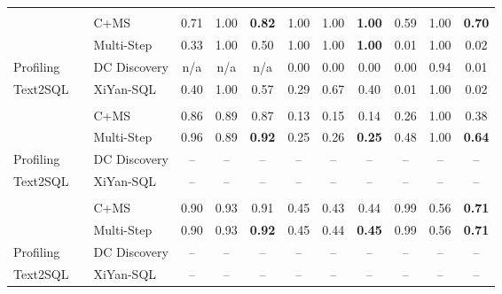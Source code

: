 \begin{tabular}{llccccccccc}
\midrule
\addlinespace[2pt]
\multicolumn{11}{c}{\textbf{Tax}} \\
\addlinespace[1pt]
\multirow{2}{*}{\system} & ~~C+MS & 0.71 & 1.00 & \textbf{0.82} & 1.00 & 1.00 & \textbf{1.00} & 0.59 & 1.00 & \textbf{0.70} \\
 & ~~Multi-Step & 0.33 & 1.00 & 0.50 & 1.00 & 1.00 & \textbf{1.00} & 0.01 & 1.00 & 0.02 \\
\cmidrule(l){2-11}
\multirow{1}{*}{Profiling} & ~~DC Discovery & n/a & n/a & n/a & 0.00 & 0.00 & 0.00 & 0.00 & 0.94 & 0.01 \\
\cmidrule(l){2-11}
\multirow{1}{*}{Text2SQL} & ~~XiYan-SQL & 0.40 & 1.00 & 0.57 & 0.29 & 0.67 & 0.40 & 0.01 & 1.00 & 0.02 \\
\midrule
\addlinespace[2pt]
\multicolumn{11}{c}{\textbf{HMDAZ}} \\
\addlinespace[1pt]
\multirow{2}{*}{\system} & ~~C+MS & 0.86 & 0.89 & 0.87 & 0.13 & 0.15 & 0.14 & 0.26 & 1.00 & 0.38 \\
 & ~~Multi-Step & 0.96 & 0.89 & \textbf{0.92} & 0.25 & 0.26 & \textbf{0.25} & 0.48 & 1.00 & \textbf{0.64} \\
\cmidrule(l){2-11}
\multirow{1}{*}{Profiling} & ~~DC Discovery & -- & -- & -- & -- & -- & -- & -- & -- & -- \\
\cmidrule(l){2-11}
\multirow{1}{*}{Text2SQL} & ~~XiYan-SQL & -- & -- & -- & -- & -- & -- & -- & -- & -- \\
\midrule
\addlinespace[2pt]
\multicolumn{11}{c}{\textbf{HMDA Checks}} \\
\addlinespace[1pt]
\multirow{2}{*}{\system} & ~~C+MS & 0.90 & 0.93 & 0.91 & 0.45 & 0.43 & 0.44 & 0.99 & 0.56 & \textbf{0.71} \\
 & ~~Multi-Step & 0.90 & 0.93 & \textbf{0.92} & 0.45 & 0.44 & \textbf{0.45} & 0.99 & 0.56 & \textbf{0.71} \\
\cmidrule(l){2-11}
\multirow{1}{*}{Profiling} & ~~DC Discovery & -- & -- & -- & -- & -- & -- & -- & -- & -- \\
\cmidrule(l){2-11}
\multirow{1}{*}{Text2SQL} & ~~XiYan-SQL & -- & -- & -- & -- & -- & -- & -- & -- & -- \\
\bottomrule
\end{tabular}
